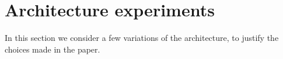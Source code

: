 
\section{Architecture experiments} \label{app_lesion_results}
In this section we consider a few variations of the architecture, to justify the choices made in the paper. \par

